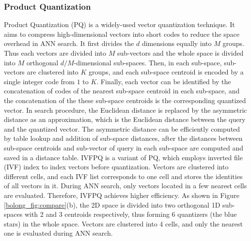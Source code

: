 \documentclass[11pt]{article}
\def\cred{\textcolor{red}}
\begin{document}
\subsubsection{Product Quantization}
Product Quantization (PQ) \cite{DBLP:journals/pami/JegouDS11} is a widely-used vector quantization technique. It aims to compress high-dimensional vectors into short codes to reduce the space overhead in ANN search. It first divides the $d$ dimensions equally into $M$ groups. Thus each vectors are divided into $M$ sub-vectors and the whole space is divided into $M$ orthogonal $d/M$-dimensional sub-spaces. Then, in each sub-space, sub-vectors are clustered into $K$ groups, and each sub-space centroid is encoded by a single integer code from $1$ to $K$. Finally, each vector can be identified by the concatenation of codes of the nearest sub-space centroid in each sub-space, and the concatenation of the these sub-space centroids is the corresponding quantized vector. In search procedure, the Euclidean distance is replaced by the asymmetric distance as an approximation, which is the Euclidean distance between the query and the quantized vector. The asymmetric distance can be efficiently computed by table lookup and addition of sub-space distances, after the distances between sub-space centroids and sub-vector of query in each sub-space are computed and saved in a distance table. IVFPQ is a variant of PQ, which employs inverted file (IVF) index to index vectors before quantization. Vectors are clustered into different cells, and each IVF list corresponds to one cell and stores the identities of all vectors in it. During ANN search, only vectors located in a few nearest cells are evaluated. Therefore, IVFPQ achieves higher efficiency.
As shown in Figure \ref{bolong_fig:compare}(b), the 2D space is divided into two orthogonal 1D sub-spaces with 2 and 3 centroids respectively, thus forming 6 quantizers (the blue stars) in the whole space. Vectors are clustered into 4 cells, and only the nearest one is evaluated during ANN search.
\end{document}
